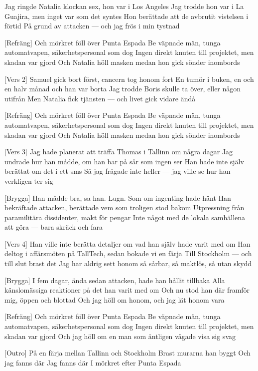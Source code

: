 \begin{lyrics}
[Vers 1]
Jag ringde Natalia klockan sex, hon var i Los Angeles
Jag trodde hon var i La Guajira, men inget var som det syntes
Hon berättade att de avbrutit vistelsen i förtid
På grund av attacken — och jag frös i min tystnad

[Refräng]
Och mörkret föll över Punta Espada
Be väpnade män, tunga automatvapen, säkerhetspersonal som dog
Ingen direkt knuten till projektet, men skadan var gjord
Och Natalia höll masken medan hon gick sönder inombords

[Vers 2]
Samuel gick bort först, cancern tog honom fort
En tumör i buken, en och en halv månad och han var borta
Jag trodde Boris skulle ta över, eller någon utifrån
Men Natalia fick tjänsten — och livet gick vidare ändå

[Refräng]
Och mörkret föll över Punta Espada
Be väpnade män, tunga automatvapen, säkerhetspersonal som dog
Ingen direkt knuten till projektet, men skadan var gjord
Och Natalia höll masken medan hon gick sönder inombords

[Vers 3]
Jag hade planerat att träffa Thomas i Tallinn om några dagar
Jag undrade hur han mådde, om han bar på sår som ingen ser
Han hade inte själv berättat om det i ett sms
Så jag frågade inte heller — jag ville se hur han verkligen ter sig

[Brygga]
Han mådde bra, sa han. Lugn. Som om ingenting hade hänt
Han bekräftade attacken, berättade vem som troligen stod bakom
Utpressning från paramilitära dissidenter, makt för pengar
Inte något med de lokala samhällena att göra — bara skräck och fara

[Vers 4]
Han ville inte berätta detaljer om vad han själv hade varit med om
Han deltog i affärsmöten på TallTech, sedan bokade vi en färja
Till Stockholm — och till slut brast det
Jag har aldrig sett honom så sårbar, så maktlös, så utan skydd

[Brygga]
I fem dagar, ända sedan attacken, hade han hållit tillbaka
Alla känslomässiga reaktioner på det han varit med om
Och nu stod han där framför mig, öppen och blottad
Och jag höll om honom, och jag lät honom vara

[Refräng]
Och mörkret föll över Punta Espada
Be väpnade män, tunga automatvapen, säkerhetspersonal som dog
Ingen direkt knuten till projektet, men skadan var gjord
Och jag höll om en man som äntligen vågade visa sig svag

[Outro]
På en färja mellan Tallinn och Stockholm
Brast murarna han byggt
Och jag fanns där
Jag fanns där
I mörkret efter Punta Espada
\end{lyrics}

